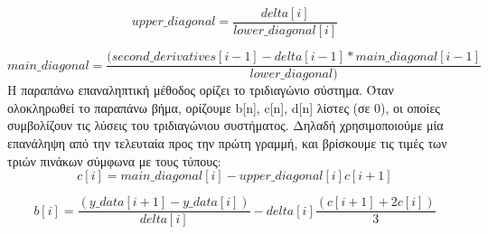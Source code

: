 \documentclass{article}
\begin{document}
\begin{equation*}
    upper\_diagonal = \dfrac{delta[i]}{lower\_diagonal[i]}
\end{equation*}
    
\begin{equation*}
    main\_diagonal = \dfrac{(second\_derivatives[i-1] - delta[i-1] * main\_diagonal[i-1]}{lower\_diagonal)}
\end{equation*}
Η παραπάνω επαναληπτική μέθοδος ορίζει το τριδιαγώνιο σύστημα.
Όταν ολοκληρωθεί το παραπάνω βήμα, ορίζουμε b[n], c[n], d[n] λίστες (σε 0), οι οποίες συμβολίζουν τις λύσεις του τριδιαγώνιου συστήματος. Δηλαδή χρησιμοποιούμε μία επανάληψη από την τελευταία προς την πρώτη γραμμή, και βρίσκουμε τις τιμές των τριών πινάκων σύμφωνα με τους τύπους:
\begin{equation*}
    c[i] = main\_diagonal[i] - upper\_diagonal[i]c[i+1]
\end{equation*}

\begin{equation*}
    b[i] = \dfrac{(y\_data[i+1] - y\_data[i])}{delta[i]}  - delta[i]\dfrac{(c[i + 1] +2c[i])}{3}
\end{equation*}
\end{document}
